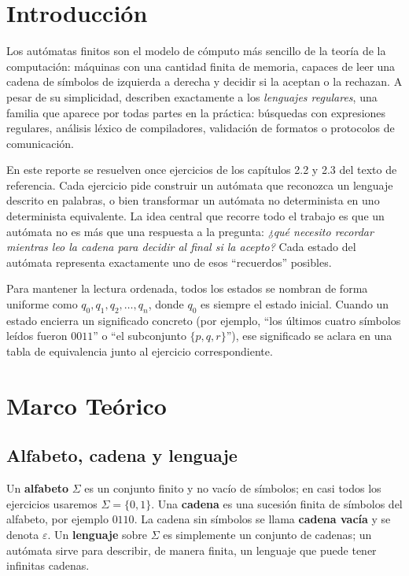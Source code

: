 \documentclass[12pt]{article}
\begin{document}
\clearpage
\tableofcontents

\clearpage
\section{Introducción}

Los autómatas finitos son el modelo de cómputo más sencillo de la teoría de la computación: máquinas con una cantidad finita de memoria, capaces de leer una cadena de símbolos de izquierda a derecha y decidir si la aceptan o la rechazan. A pesar de su simplicidad, describen exactamente a los \emph{lenguajes regulares}, una familia que aparece por todas partes en la práctica: búsquedas con expresiones regulares, análisis léxico de compiladores, validación de formatos o protocolos de comunicación.

En este reporte se resuelven once ejercicios de los capítulos 2.2 y 2.3 del texto de referencia. Cada ejercicio pide construir un autómata que reconozca un lenguaje descrito en palabras, o bien transformar un autómata no determinista en uno determinista equivalente. La idea central que recorre todo el trabajo es que un autómata no es más que una respuesta a la pregunta: \emph{¿qué necesito recordar mientras leo la cadena para decidir al final si la acepto?} Cada estado del autómata representa exactamente uno de esos ``recuerdos'' posibles.

Para mantener la lectura ordenada, todos los estados se nombran de forma uniforme como $q_0, q_1, q_2, \dots, q_n$, donde $q_0$ es siempre el estado inicial. Cuando un estado encierra un significado concreto (por ejemplo, ``los últimos cuatro símbolos leídos fueron $0011$'' o ``el subconjunto $\{p,q,r\}$''), ese significado se aclara en una tabla de equivalencia junto al ejercicio correspondiente.

\clearpage
\section{Marco Teórico}

\subsection{Alfabeto, cadena y lenguaje}

Un \textbf{alfabeto} $\Sigma$ es un conjunto finito y no vacío de símbolos; en casi todos los ejercicios usaremos $\Sigma=\{0,1\}$. Una \textbf{cadena} es una sucesión finita de símbolos del alfabeto, por ejemplo $0110$. La cadena sin símbolos se llama \textbf{cadena vacía} y se denota $\varepsilon$. Un \textbf{lenguaje} sobre $\Sigma$ es simplemente un conjunto de cadenas; un autómata sirve para describir, de manera finita, un lenguaje que puede tener infinitas cadenas.
\end{document}
